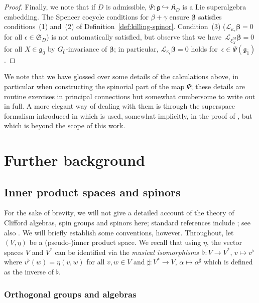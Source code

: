 \documentclass[11pt]{article}
\numberwithin{equation}{section}
\numberwithin{equation}{section}
\newcommand{\fg}{\mathfrak{g}}
\newcommand{\fK}{\mathfrak{K}}
\newcommand{\fS}{\mathfrak{S}}
\newcommand{\eL}{\mathscr{L}}
\newcommand{\1}{\mathbbm{1}}
\begin{document}
\begin{proof}
	Finally, we note that if $D$ is admissible, $\Psi\colon\fg\hookrightarrow\fK_D$ is a Lie superalgebra embedding. The Spencer cocycle conditions for $\beta+\gamma$ ensure $\boldsymbol{\beta}$ satisfies conditions~(1) and~(2) of Definition~\ref{def:killing-spinor}. Condition~(3) ($\eL_{\kappa_\epsilon}\boldsymbol{\beta}=0$ for all $\epsilon\in\fS_D$) is not automatically satisfied, but observe that we have~$\eL_{\xi^M_X}\boldsymbol{\beta}=0$ for all $X\in\fg_{\overline 0}$ by $G_{\overline 0}$-invariance of $\boldsymbol{\beta}$; in particular, $\eL_{\kappa_\epsilon}\boldsymbol{\beta}=0$ holds for~${\epsilon\in\Psi(\fg_{\overline 1})}$.
\end{proof}

We note that we have glossed over some details of the calculations above, in particular when constructing the spinorial part of the map $\Psi$; these details are routine exercises in principal connections but somewhat cumbersome to write out in full. A more elegant way of dealing with them is through the superspace formalism introduced in \cite{Santi2010} which is used, somewhat implicitly, in the proof of \cite[Theorem~13]{Figueroa-OFarrill2017_1}, but which is beyond the scope of this work.


\appendix

\section{Further background}
\label{app:further-background}

\subsection{Inner product spaces and spinors}
\label{sec:inner-products-spinors}

For the sake of brevity, we will not give a detailed account of the theory of Clifford algebras, spin groups and spinors here; standard references include \cite{Harvey1990,Lawson1989}; see also \cite{JMF-spin}. We will briefly establish some conventions, however. Throughout, let $(V,\eta)$ be a (pseudo-)inner product space.
We recall that using $\eta$, the vector spaces $V$ and $V^*$ can be identified via the \emph{musical isomorphisms}~${\flat\colon V\to V^*}$, $v\mapsto v^\flat$ where
$v^\flat(w) = \eta(v,w)
$
for all $v,w\in V$ and $\sharp\colon V^*\to V$, $\alpha\mapsto\alpha^\sharp$ which is defined as the inverse of $\flat$.

\subsubsection{Orthogonal groups and algebras}
\label{sec:orth-groups-algs}
\end{document}
